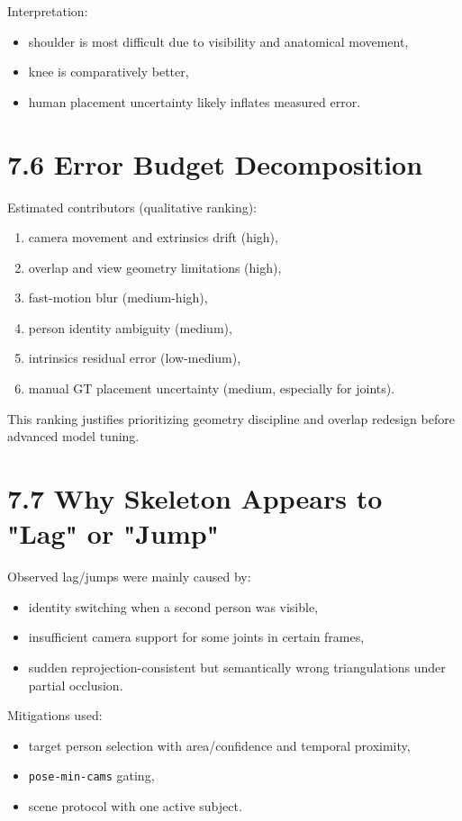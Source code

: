 Interpretation:
\begin{itemize}
  \item shoulder is most difficult due to visibility and anatomical movement,
  \item knee is comparatively better,
  \item human placement uncertainty likely inflates measured error.
\end{itemize}

\section{7.6 Error Budget Decomposition}
Estimated contributors (qualitative ranking):
\begin{enumerate}
  \item camera movement and extrinsics drift (high),
  \item overlap and view geometry limitations (high),
  \item fast-motion blur (medium-high),
  \item person identity ambiguity (medium),
  \item intrinsics residual error (low-medium),
  \item manual GT placement uncertainty (medium, especially for joints).
\end{enumerate}

This ranking justifies prioritizing geometry discipline and overlap redesign before advanced model tuning.

\section{7.7 Why Skeleton Appears to "Lag" or "Jump"}
Observed lag/jumps were mainly caused by:
\begin{itemize}
  \item identity switching when a second person was visible,
  \item insufficient camera support for some joints in certain frames,
  \item sudden reprojection-consistent but semantically wrong triangulations under partial occlusion.
\end{itemize}

Mitigations used:
\begin{itemize}
  \item target person selection with area/confidence and temporal proximity,
  \item \texttt{pose-min-cams} gating,
  \item scene protocol with one active subject.
\end{itemize}

